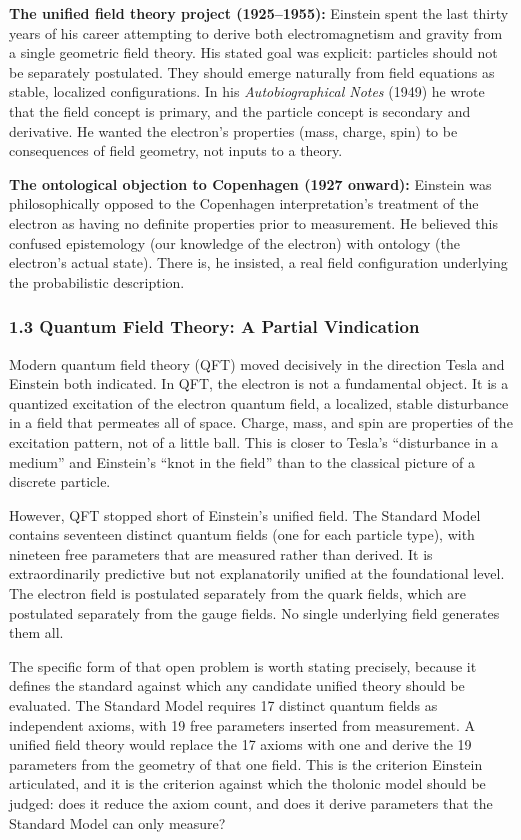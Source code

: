 \documentclass[
  11pt,
  letterpaper,
]{article}
\begin{document}
\textbf{The unified field theory project (1925--1955):} Einstein spent
the last thirty years of his career attempting to derive both
electromagnetism and gravity from a single geometric field theory. His
stated goal was explicit: particles should not be separately postulated.
They should emerge naturally from field equations as stable, localized
configurations. In his \emph{Autobiographical Notes} (1949) he wrote
that the field concept is primary, and the particle concept is secondary
and derivative. He wanted the electron's properties (mass, charge, spin)
to be consequences of field geometry, not inputs to a theory.

\textbf{The ontological objection to Copenhagen (1927 onward):} Einstein
was philosophically opposed to the Copenhagen interpretation's treatment
of the electron as having no definite properties prior to measurement.
He believed this confused epistemology (our knowledge of the electron)
with ontology (the electron's actual state). There is, he insisted, a
real field configuration underlying the probabilistic description.

\subsubsection{1.3 Quantum Field Theory: A Partial
Vindication}\label{quantum-field-theory-a-partial-vindication}

Modern quantum field theory (QFT) moved decisively in the direction
Tesla and Einstein both indicated. In QFT, the electron is not a
fundamental object. It is a quantized excitation of the electron quantum
field, a localized, stable disturbance in a field that permeates all of
space. Charge, mass, and spin are properties of the excitation pattern,
not of a little ball. This is closer to Tesla's ``disturbance in a
medium'' and Einstein's ``knot in the field'' than to the classical
picture of a discrete particle.

However, QFT stopped short of Einstein's unified field. The Standard
Model contains seventeen distinct quantum fields (one for each particle
type), with nineteen free parameters that are measured rather than
derived. It is extraordinarily predictive but not explanatorily unified
at the foundational level. The electron field is postulated separately
from the quark fields, which are postulated separately from the gauge
fields. No single underlying field generates them all.

The specific form of that open problem is worth stating precisely,
because it defines the standard against which any candidate unified
theory should be evaluated. The Standard Model requires 17 distinct
quantum fields as independent axioms, with 19 free parameters inserted
from measurement. A unified field theory would replace the 17 axioms
with one and derive the 19 parameters from the geometry of that one
field. This is the criterion Einstein articulated, and it is the
criterion against which the tholonic model should be judged: does it
reduce the axiom count, and does it derive parameters that the Standard
Model can only measure?
\end{document}
